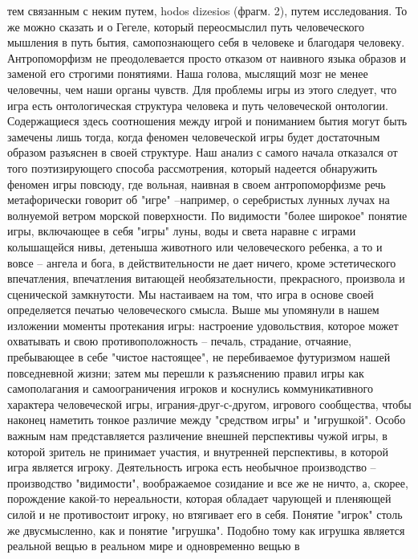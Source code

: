 \documentclass[12pt]{article}
\begin{document}
тем связанным с неким путем, hodos dizesios (фрагм. 2), путем исследования. То же можно сказать и о Гегеле,
который  переосмыслил  путь  человеческого  мышления  в  путь  бытия,  самопознающего  себя  в  человеке  и
благодаря человеку. Антропоморфизм не преодолевается просто отказом от наивного языка образов и заменой
его строгими понятиями. Наша голова, мыслящий мозг не менее человечны, чем наши органы чувств. Для
проблемы  игры  из  этого  следует,  что  игра  есть  онтологическая  структура  человека  и  путь  человеческой
онтологии. Содержащиеся здесь соотношения между игрой и пониманием бытия могут быть замечены лишь
тогда, когда феномен человеческой игры будет достаточным образом разъяснен в своей структуре. Наш анализ с
самого начала отказался от того поэтизирующего способа рассмотрения, который надеется обнаружить феномен
игры  повсюду,  где  вольная,  наивная  в  своем  антропоморфизме  речь  метафорически  говорит  об  "игре"  --например, о серебристых лунных лучах на волнуемой ветром морской поверхности. По видимости "более
широкое" понятие игры, включающее в себя "игры" луны, воды и света наравне с играми колышащейся нивы,
детеныша животного или человеческого ребенка, а то и вовсе -- ангела и бога, в действительности не дает
ничего, кроме эстетического впечатления, впечатления витающей необязательности, прекрасного, произвола и
сценической замкнутости. Мы настаиваем на том, что игра в основе своей определяется печатью человеческого
смысла. Выше мы упомянули в нашем изложении моменты протекания игры: настроение удовольствия, которое
может охватывать и свою противоположность -- печаль, страдание, отчаяние, пребывающее в себе "чистое
настоящее", не перебиваемое футуризмом нашей повседневной жизни; затем мы перешли к разъяснению правил
игры как самополагания и самоограничения игроков и коснулись коммуникативного характера человеческой
игры, играния-друг-с-другом, игрового сообщества, чтобы наконец наметить тонкое различие между "средством
игры"  и "игрушкой". Особо  важным нам представляется различение  внешней перспективы чужой игры,  в
которой  зритель  не  принимает  участия,  и  внутренней  перспективы,  в  которой  игра  является  игроку.
Деятельность игрока есть необычное производство -- производство "видимости", воображаемое созидание и все
же не ничто, а, скорее, порождение какой-то нереальности, которая обладает чарующей и пленяющей силой и не
противостоит  игроку,  но  втягивает  его  в  себя.  Понятие  "игрок"  столь  же  двусмысленно,  как  и  понятие
"игрушка". Подобно тому как игрушка является реальной вещью в реальном мире и одновременно вещью в
\end{document}
